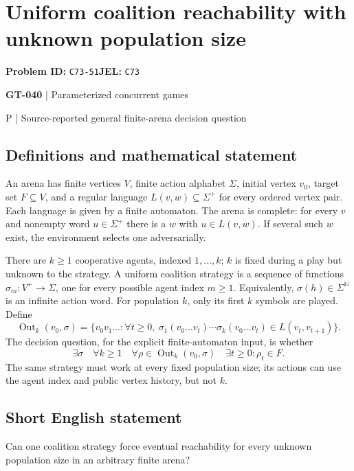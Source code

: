 \documentclass[11pt,a4paper]{article}
\begin{document}
\section*{Uniform coalition reachability with unknown population size}
\textbf{Problem ID:} \texttt{C73-51}\quad \textbf{JEL:} \texttt{C73}\par
\label{problem:OP-0170}
\label{game:GT-040}
{\sffamily\small\color{muted}
{\sffamily\small\color{muted}\textbf{GT-040} | Parameterized concurrent games\par P | Source-reported general finite-arena decision question\par}
\par}
\subsection*{Definitions and mathematical statement}
An arena has finite vertices $V$, finite action alphabet $\Sigma$, initial vertex $v_0$, target set $F\subseteq V$, and a regular language $L(v,w)\subseteq\Sigma^+$ for every ordered vertex pair. Each language is given by a finite automaton. The arena is complete: for every $v$ and nonempty word $u\in\Sigma^+$ there is a $w$ with $u\in L(v,w)$. If several such $w$ exist, the environment selects one adversarially.

There are $k\geq1$ cooperative agents, indexed $1,\ldots,k$; $k$ is fixed during a play but unknown to the strategy. A uniform coalition strategy is a sequence of functions $\sigma_m:V^+\to\Sigma$, one for every possible agent index $m\geq1$. Equivalently, $\sigma(h)\in\Sigma^{\mathbb N}$ is an infinite action word. For population $k$, only its first $k$ symbols are played. Define
\[
 \operatorname{Out}_k(v_0,\sigma)=
 \{v_0v_1\ldots:\forall t\geq0,\ 
 \sigma_1(v_0\ldots v_t)\cdots\sigma_k(v_0\ldots v_t)
 \in L(v_t,v_{t+1})\}.
\]
The decision question, for the explicit finite-automaton input, is whether
\[
 \exists\sigma\quad\forall k\geq1\quad
 \forall\rho\in\operatorname{Out}_k(v_0,\sigma)\quad
 \exists t\geq0:\rho_t\in F.
\]
The same strategy must work at every fixed population size; its actions can use the agent index and public vertex history, but not $k$.
\subsection*{Short English statement}
Can one coalition strategy force eventual reachability for every unknown population size in an arbitrary finite arena?
\end{document}
